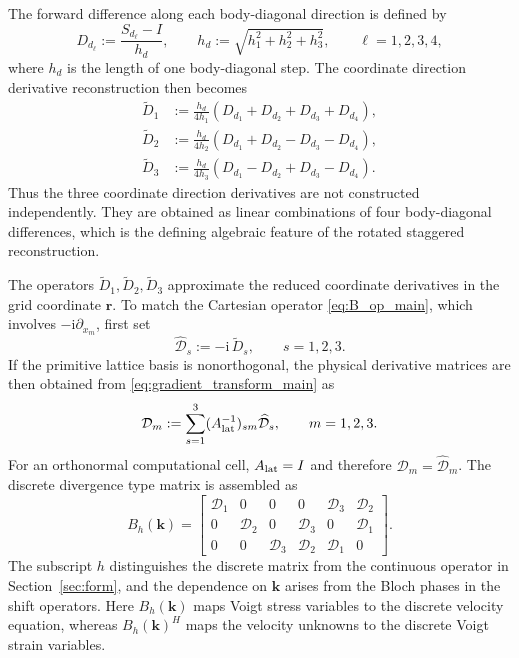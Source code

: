 \documentclass[11pt,oneside]{article}
\numberwithin{equation}{section}
\theoremstyle{plain}
\theoremstyle{remark}
\newcommand{\bk}{\bm{k}}
\newcommand{\br}{\bm{r}}
\begin{document}
The forward difference along each body-diagonal direction is defined by
\begin{equation}\label{eq:Dd_def_main}
D_{d_\ell}:=\frac{S_{d_\ell}-I}{h_d},
\qquad
h_d:=\sqrt{h_1^2+h_2^2+h_3^2},
\qquad \ell=1,2,3,4,
\end{equation}
where \(h_d\) is the length of one body-diagonal step. The coordinate direction derivative reconstruction then becomes
\begin{equation}\label{eq:Dtilde_recon_main}
\begin{aligned}
\widetilde D_1&:=\frac{h_d}{4h_1}
\left(D_{d_1}+D_{d_2}+D_{d_3}+D_{d_4}\right),\\
\widetilde D_2&:=\frac{h_d}{4h_2}
\left(D_{d_1}+D_{d_2}-D_{d_3}-D_{d_4}\right),\\
\widetilde D_3&:=\frac{h_d}{4h_3}
\left(D_{d_1}-D_{d_2}+D_{d_3}-D_{d_4}\right).
\end{aligned}
\end{equation}
Thus the three coordinate direction derivatives are not constructed independently. They are obtained as linear combinations of four body-diagonal differences, which is the defining algebraic feature of the rotated staggered reconstruction.

The operators \(\widetilde D_1,\widetilde D_2,\widetilde D_3\) approximate the reduced coordinate derivatives in the grid coordinate \(\br\). To match the Cartesian operator \eqref{eq:B_op_main}, which involves \(-\mathrm i\partial_{x_m}\), first set
\begin{equation}\label{eq:Dhat_def_main}
\widehat{\mathcal D}_s:=-\mathrm i\,\widetilde D_s,
\qquad s=1,2,3.
\end{equation}
If the primitive lattice basis is nonorthogonal, the physical derivative matrices are then obtained from \eqref{eq:gradient_transform_main} as
\begin{equation}\label{eq:Dcal_cartesian_transform_main}
\mathcal D_m:=\sum_{s=1}^3 (A_{\rm lat}^{-1})_{s m}\widehat{\mathcal D}_s,
\qquad m=1,2,3.
\end{equation}
For an orthonormal computational cell, \(A_{\rm lat}=I\) and therefore \(\mathcal D_m=\widehat{\mathcal D}_m\). The discrete divergence type matrix is assembled as
\begin{equation}\label{eq:B_discrete_main}
B_h(\bk)=
\begin{bmatrix}
\mathcal D_1 & 0 & 0 & 0 & \mathcal D_3 & \mathcal D_2\\
0 & \mathcal D_2 & 0 & \mathcal D_3 & 0 & \mathcal D_1\\
0 & 0 & \mathcal D_3 & \mathcal D_2 & \mathcal D_1 & 0
\end{bmatrix}.
\end{equation}
The subscript \(h\) distinguishes the discrete matrix from the continuous operator in Section~\ref{sec:form}, and the dependence on \(\bk\) arises from the Bloch phases in the shift operators. Here \(B_h(\bk)\) maps Voigt stress variables to the discrete velocity equation, whereas \(B_h(\bk)^H\) maps the velocity unknowns to the discrete Voigt strain variables.
\end{document}
